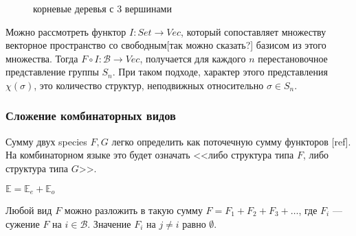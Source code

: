 \begin{figure}
\begin{center}
\end{center}
\caption{корневые деревья с 3 вершинами}
\label{pic:3-rooted-trees}
\end{figure}

Можно рассмотреть функтор $I:Set \rightarrow Vec$, который сопоставляет множеству
векторное пространство со свободным[так можно сказать?] базисом из этого
множества.
Тогда $F \circ I: \mathcal B \rightarrow Vec$, получается для каждого $n$
перестановочное представление группы $S_n$. При таком подходе, характер этого
представления $\chi(\sigma)$, это количество структур, неподвижных относительно $\sigma \in S_n$.

\subsubsection{Сложение комбинаторных видов}
Сумму двух species $F, G$ легко определить как поточечную сумму функторов [ref].
На комбинаторном языке это будет означать <<либо структура типа $F$, либо
структура типа $G$>>. 
\begin{example}
$\mathbb E = \mathbb E_e + \mathbb E_o$
\end{example}
\begin{example}
Любой вид $F$ можно разложить в такую сумму $F =
F_{1} + F_{2} + F_{3} + \dots$, где $F_{i}$ --- сужение $F$ на $i \in \mathcal
B$. Значение $F_{i}$ на $j \neq i$ равно $\emptyset$.
\end{example}

